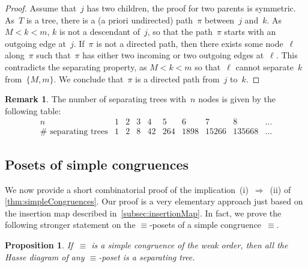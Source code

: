 \documentclass{amsart}
\newtheorem{proposition}[theorem]{Proposition}
\theoremstyle{definition}
\newtheorem{remark}[theorem]{Remark}
\begin{document}
\begin{proof}
Assume that~$j$ has two children, the proof for two parents is symmetric.
As~$T$ is a tree, there is a (a priori undirected) path~$\pi$ between~$j$ and~$k$.
As~$M < k < m$, $k$ is not a descendant of~$j$, so that the path~$\pi$ starts with an outgoing edge at~$j$.
If~$\pi$ is not a directed path, then there exists some node~$\ell$ along~$\pi$ such that~$\pi$ has either two incoming or two outgoing edges at~$\ell$.
This contradicts the separating property, as $M < k < m$ so that~$\ell$ cannot separate~$k$ from~$\{M,m\}$.
We conclude that~$\pi$ is a directed path from~$j$ to~$k$.
\end{proof}

\begin{remark}
The number of separating trees with~$n$ nodes is given by the following table:
\[
\begin{array}{c|ccccccccc}
n & 1 & 2 & 3 & 4 & 5 & 6 & 7 & 8 & \dots \\
\hline
\#\text{ separating trees} & 1 & 2 & 8 & 42 & 264 & 1898 & 15266 & 135668 & \dots
\end{array}
\]
\end{remark}


\subsection{Posets of simple congruences}
\label{subsec:posetsSimpleCongruences}

We now provide a short combinatorial proof of the implication~(i)~$\Longrightarrow$~(ii) of \cref{thm:simpleCongruences}.
Our proof is a very elementary approach just based on the insertion map described in~\cref{subsec:insertionMap}.
In fact, we prove the following stronger statement on the $\equiv$-posets of a simple congruence~$\equiv$.

\begin{proposition}
\label{prop:simpleImpliesSeparatingTrees}
If~$\equiv$ is a simple congruence of the weak order, then all the Hasse diagram of any $\equiv$-poset is a separating tree.
\end{proposition}
\end{document}
